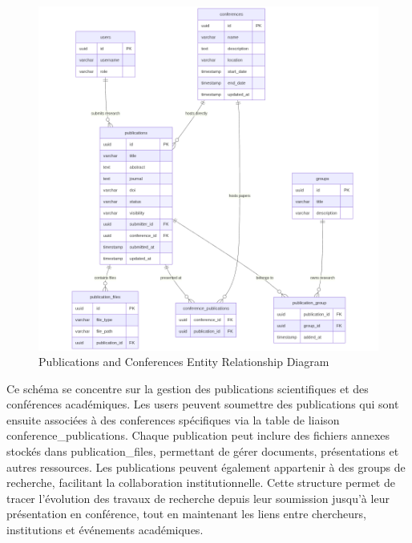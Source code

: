 \documentclass{rapportPfe}
\begin{document}
\begin{figure}[htbp]
    \centering
    \includegraphics[width=1.0\textwidth]{diagrams/diagram7.png}
    \caption{Publications and Conferences Entity Relationship Diagram}
    \label{fig:diagram5}
\end{figure}

Ce schéma se concentre sur la gestion des publications scientifiques et des conférences académiques. Les users peuvent soumettre des publications qui sont ensuite associées à des conferences spécifiques via la table de liaison conference\_publications. Chaque publication peut inclure des fichiers annexes stockés dans publication\_files, permettant de gérer documents, présentations et autres ressources. Les publications peuvent également appartenir à des groups de recherche, facilitant la collaboration institutionnelle. Cette structure permet de tracer l'évolution des travaux de recherche depuis leur soumission jusqu'à leur présentation en conférence, tout en maintenant les liens entre chercheurs, institutions et événements académiques.
\end{document}
